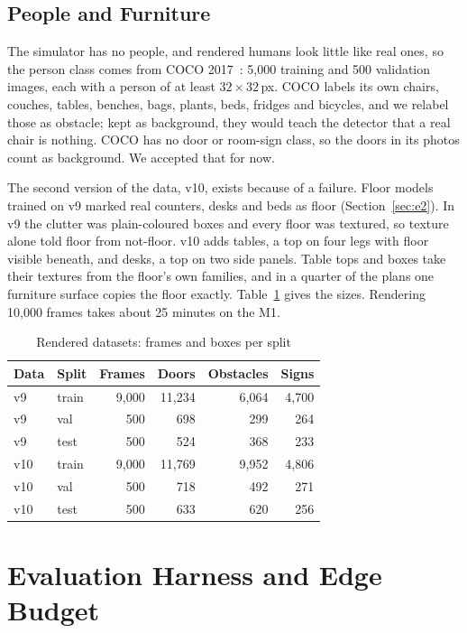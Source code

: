 \documentclass[conference]{IEEEtran}
\begin{document}
\subsection{People and Furniture}

The simulator has no people, and rendered humans look little like real ones,
so the person class comes from COCO 2017~\cite{lin2014coco}: 5{,}000 training
and 500 validation images, each with a person of at least $32\times32$\,px.
COCO labels its own chairs, couches, tables, benches, bags, plants, beds,
fridges and bicycles, and we relabel those as obstacle; kept as background,
they would teach the detector that a real chair is nothing. COCO has no door
or room-sign class, so the doors in its photos count as background. We
accepted that for now.

The second version of the data, v10, exists because of a failure. Floor
models trained on v9 marked real counters, desks and beds as floor
(Section~\ref{sec:e2}). In v9 the clutter was plain-coloured boxes and every
floor was textured, so texture alone told floor from not-floor. v10 adds
tables, a top on four legs with floor visible beneath, and desks, a top on
two side panels. Table tops and boxes take their textures from the floor's
own families, and in a quarter of the plans one furniture surface copies the
floor exactly. Table~\ref{tab:datasets} gives the sizes. Rendering 10{,}000
frames takes about 25 minutes on the M1.

\begin{table}[t]
\caption{Rendered datasets: frames and boxes per split}
\label{tab:datasets}
\centering
\small
\begin{tabular}{@{}llrrrr@{}}
\toprule
Data & Split & Frames & Doors & Obstacles & Signs \\
\midrule
v9 & train & 9{,}000 & 11{,}234 & 6{,}064 & 4{,}700 \\
v9 & val & 500 & 698 & 299 & 264 \\
v9 & test & 500 & 524 & 368 & 233 \\
v10 & train & 9{,}000 & 11{,}769 & 9{,}952 & 4{,}806 \\
v10 & val & 500 & 718 & 492 & 271 \\
v10 & test & 500 & 633 & 620 & 256 \\
\bottomrule
\end{tabular}
\end{table}

\section{Evaluation Harness and Edge Budget}
\label{sec:harness}
\end{document}
